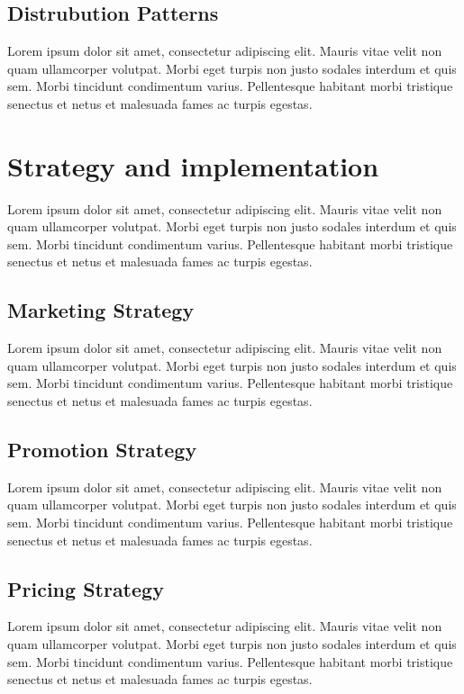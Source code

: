 \documentclass[11pt]{article}
\begin{document}
\subsection{Distrubution Patterns}
Lorem ipsum dolor sit amet, consectetur adipiscing elit. Mauris vitae velit 
non quam ullamcorper volutpat. Morbi eget turpis non justo sodales interdum 
et quis sem. Morbi tincidunt condimentum varius. Pellentesque habitant morbi 
tristique senectus et netus et malesuada fames ac turpis egestas.\newline
\pagebreak

\section{Strategy and implementation}
Lorem ipsum dolor sit amet, consectetur adipiscing elit. Mauris vitae velit 
non quam ullamcorper volutpat. Morbi eget turpis non justo sodales interdum 
et quis sem. Morbi tincidunt condimentum varius. Pellentesque habitant morbi 
tristique senectus et netus et malesuada fames ac turpis egestas.\newline
\subsection{Marketing Strategy}
Lorem ipsum dolor sit amet, consectetur adipiscing elit. Mauris vitae velit 
non quam ullamcorper volutpat. Morbi eget turpis non justo sodales interdum 
et quis sem. Morbi tincidunt condimentum varius. Pellentesque habitant morbi 
tristique senectus et netus et malesuada fames ac turpis egestas.\newline
\subsection{Promotion  Strategy}
Lorem ipsum dolor sit amet, consectetur adipiscing elit. Mauris vitae velit 
non quam ullamcorper volutpat. Morbi eget turpis non justo sodales interdum 
et quis sem. Morbi tincidunt condimentum varius. Pellentesque habitant morbi 
tristique senectus et netus et malesuada fames ac turpis egestas.\newline
\subsection{Pricing Strategy}
Lorem ipsum dolor sit amet, consectetur adipiscing elit. Mauris vitae velit 
non quam ullamcorper volutpat. Morbi eget turpis non justo sodales interdum 
et quis sem. Morbi tincidunt condimentum varius. Pellentesque habitant morbi 
tristique senectus et netus et malesuada fames ac turpis egestas.\newline
\end{document}
